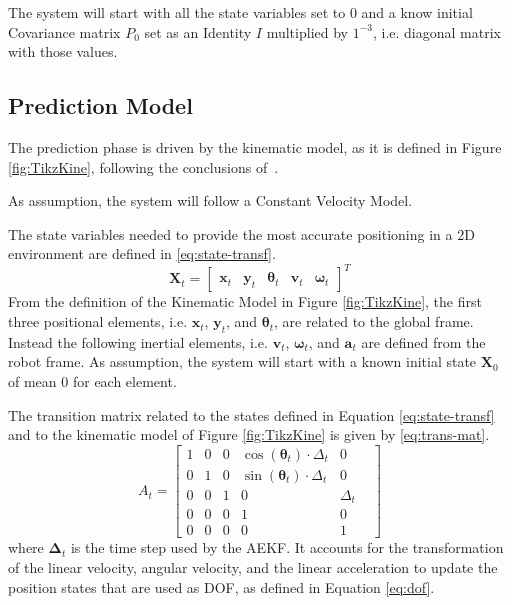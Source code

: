 The system will start with all the state variables set to $0$ and a know initial Covariance matrix $P_0$ set as an Identity $I$ multiplied by $1^{-3}$, i.e. diagonal matrix with those values.

\subsection{Prediction Model}

\noindent The prediction phase is driven by the kinematic model, as it is defined in Figure \ref{fig:TikzKine}, following the conclusions of~\cite{801027}.

As assumption, the system will follow a Constant Velocity Model.

The state variables needed to provide the most accurate positioning in a \gls{2D} environment are defined in \eqref{eq:state-transf}.
\begin{equation}
	\label{eq:state-transf}
	\mathbf{X}_t=
	\begin{bmatrix}
		\mathbf{x}_t & \mathbf{y}_t & \boldsymbol \theta_t & \mathbf{v}_t & \boldsymbol \omega_t
	\end{bmatrix} ^T
\end{equation}
From the definition of the Kinematic Model in Figure \ref{fig:TikzKine}, the first three positional elements, i.e. $\mathbf{x}_t$, $\mathbf{y}_t$, and $\boldsymbol \theta_t$, are related to the global frame. Instead the following inertial elements, i.e. $\mathbf{v}_t$, $\boldsymbol \omega_t$, and $\mathbf{a}_t$ are defined from the robot frame.
As assumption, the system will start with a known initial state $\mathbf{X}_0$ of mean $0$ for each element.

The transition matrix related to the states defined in Equation \eqref{eq:state-transf} and to the kinematic model of Figure \ref{fig:TikzKine} is given by \eqref{eq:trans-mat}.
\begin{equation}
	\label{eq:trans-mat}
	A_t
	=
	\begin{bmatrix}
		1 & 0 & 0 & \cos(\boldsymbol \theta_t) \cdot \Delta_t & 0 \\
		0 & 1 & 0 & \sin(\boldsymbol \theta_t) \cdot \Delta_t & 0 \\
		0 & 0 & 1 & 0 & \Delta_t  \\
		0 & 0 & 0 & 1 & 0 \\
		0 & 0 & 0 & 0 & 1 & 
	\end{bmatrix}
\end{equation}
where $\boldsymbol \Delta_t$ is the time step used by the \gls{AEKF}.
It accounts for the transformation of the linear velocity, angular velocity, and the linear acceleration to update the position states that are used as \gls{DOF}, as defined in Equation \eqref{eq:dof}.

